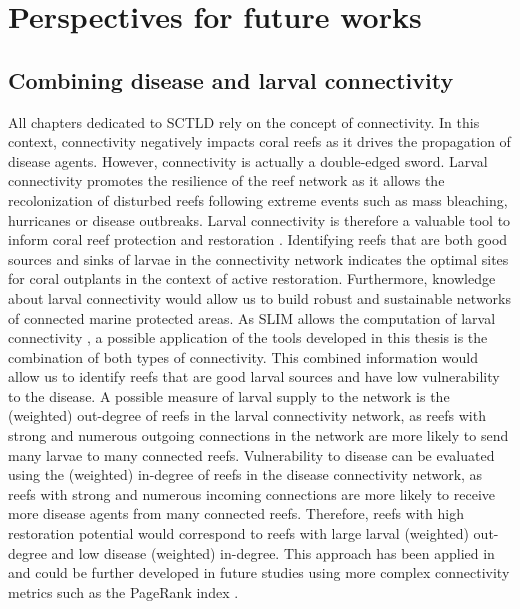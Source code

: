 \section{Perspectives for future works}

\subsection*{Combining disease and larval connectivity}
All chapters dedicated to SCTLD rely on the concept of connectivity. In this context, connectivity negatively impacts coral reefs as it drives the propagation of disease agents. However, connectivity is actually a double-edged sword. Larval connectivity promotes the resilience of the reef network as it allows the recolonization of disturbed reefs following extreme events such as mass bleaching, hurricanes or disease outbreaks. Larval connectivity is therefore a valuable tool to inform coral reef protection and restoration \citep{botsford2009connectivity,mumby2011reserve}. Identifying reefs that are both good sources and sinks of larvae in the connectivity network indicates the optimal sites for coral outplants in the context of active restoration. Furthermore, knowledge about larval connectivity would allow us to build robust and sustainable networks of connected marine protected areas. As SLIM allows the computation of larval connectivity \citep{thomas2014numerical,frys2020fine,figueiredo2021global}, a possible application of the tools developed in this thesis is the combination of both types of connectivity.  This combined information would allow us to identify reefs that are good larval sources and have low vulnerability to the disease. A possible measure of larval supply to the network is the (weighted) out-degree of reefs in the larval connectivity network, as reefs with strong and numerous outgoing connections in the network are more likely to send many larvae to many connected reefs. Vulnerability to disease can be evaluated using the (weighted) in-degree of reefs in the disease connectivity network, as reefs with strong and numerous incoming connections are more likely to receive more disease agents from many connected reefs. Therefore, reefs with high restoration potential would correspond to reefs with large larval (weighted) out-degree and low disease (weighted) in-degree. This approach has been applied in \cite{holstein2022} and could be further developed in future studies using more complex connectivity metrics such as the PageRank index \citep{frys2020fine}. 

